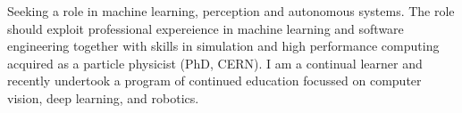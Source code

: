 

\begin{cvparagraph}


Seeking a role in machine learning, perception and autonomous systems. The role should exploit 
professional expereience in machine learning and software engineering together with  skills in 
simulation and high performance computing acquired as a particle physicist (PhD, CERN). 
I am a continual learner and recently undertook a program of continued education focussed on computer vision, 
deep learning, and robotics.

\end{cvparagraph}